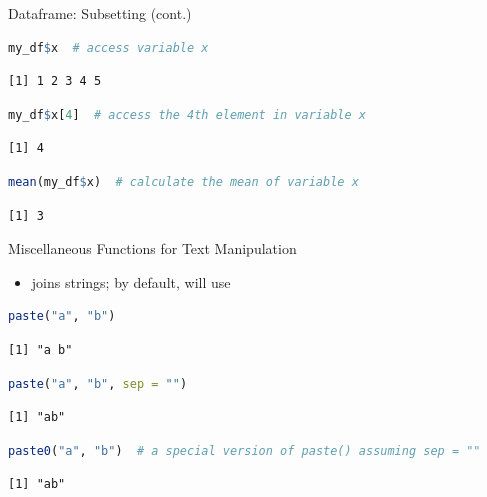 \begin{frame}[fragile]{Dataframe: Subsetting (cont.)}
\begin{lstlisting}[language=R]
my_df$x  # access variable x
\end{lstlisting}
\begin{lstlisting}[style=output]
[1] 1 2 3 4 5
\end{lstlisting}
\begin{lstlisting}[language=R]
my_df$x[4]  # access the 4th element in variable x
\end{lstlisting}
\begin{lstlisting}[style=output]
[1] 4
\end{lstlisting}
\begin{lstlisting}[language=R]
mean(my_df$x)  # calculate the mean of variable x
\end{lstlisting}
\begin{lstlisting}[style=output]
[1] 3
\end{lstlisting}
\end{frame}

\begin{frame}[fragile]{Miscellaneous Functions for Text Manipulation}
\begin{itemize}
  \item {} joins strings; by default,  will use \mbox{}
\end{itemize}
\begin{lstlisting}[language=R]
paste("a", "b")
\end{lstlisting}
\begin{lstlisting}[style=output]
[1] "a b"
\end{lstlisting}
\begin{lstlisting}[language=R]
paste("a", "b", sep = "")
\end{lstlisting}
\begin{lstlisting}[style=output]
[1] "ab"
\end{lstlisting}
\begin{lstlisting}[language=R]
paste0("a", "b")  # a special version of paste() assuming sep = ""
\end{lstlisting}
\begin{lstlisting}[style=output]
[1] "ab"
\end{lstlisting}
\end{frame}

